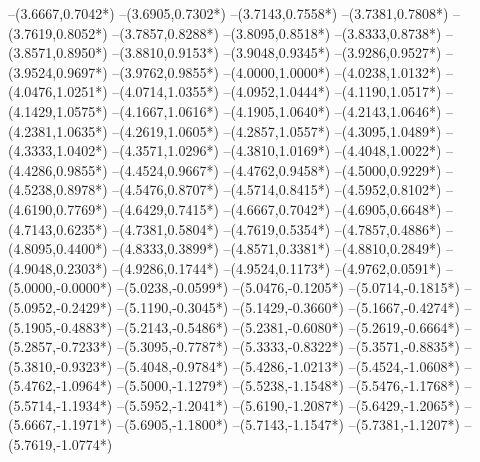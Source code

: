 {	--(3.6667,{0.7042*\yskala})
	--(3.6905,{0.7302*\yskala})
	--(3.7143,{0.7558*\yskala})
	--(3.7381,{0.7808*\yskala})
	--(3.7619,{0.8052*\yskala})
	--(3.7857,{0.8288*\yskala})
	--(3.8095,{0.8518*\yskala})
	--(3.8333,{0.8738*\yskala})
	--(3.8571,{0.8950*\yskala})
	--(3.8810,{0.9153*\yskala})
	--(3.9048,{0.9345*\yskala})
	--(3.9286,{0.9527*\yskala})
	--(3.9524,{0.9697*\yskala})
	--(3.9762,{0.9855*\yskala})
	--(4.0000,{1.0000*\yskala})
	--(4.0238,{1.0132*\yskala})
	--(4.0476,{1.0251*\yskala})
	--(4.0714,{1.0355*\yskala})
	--(4.0952,{1.0444*\yskala})
	--(4.1190,{1.0517*\yskala})
	--(4.1429,{1.0575*\yskala})
	--(4.1667,{1.0616*\yskala})
	--(4.1905,{1.0640*\yskala})
	--(4.2143,{1.0646*\yskala})
	--(4.2381,{1.0635*\yskala})
	--(4.2619,{1.0605*\yskala})
	--(4.2857,{1.0557*\yskala})
	--(4.3095,{1.0489*\yskala})
	--(4.3333,{1.0402*\yskala})
	--(4.3571,{1.0296*\yskala})
	--(4.3810,{1.0169*\yskala})
	--(4.4048,{1.0022*\yskala})
	--(4.4286,{0.9855*\yskala})
	--(4.4524,{0.9667*\yskala})
	--(4.4762,{0.9458*\yskala})
	--(4.5000,{0.9229*\yskala})
	--(4.5238,{0.8978*\yskala})
	--(4.5476,{0.8707*\yskala})
	--(4.5714,{0.8415*\yskala})
	--(4.5952,{0.8102*\yskala})
	--(4.6190,{0.7769*\yskala})
	--(4.6429,{0.7415*\yskala})
	--(4.6667,{0.7042*\yskala})
	--(4.6905,{0.6648*\yskala})
	--(4.7143,{0.6235*\yskala})
	--(4.7381,{0.5804*\yskala})
	--(4.7619,{0.5354*\yskala})
	--(4.7857,{0.4886*\yskala})
	--(4.8095,{0.4400*\yskala})
	--(4.8333,{0.3899*\yskala})
	--(4.8571,{0.3381*\yskala})
	--(4.8810,{0.2849*\yskala})
	--(4.9048,{0.2303*\yskala})
	--(4.9286,{0.1744*\yskala})
	--(4.9524,{0.1173*\yskala})
	--(4.9762,{0.0591*\yskala})
	--(5.0000,{-0.0000*\yskala})
	--(5.0238,{-0.0599*\yskala})
	--(5.0476,{-0.1205*\yskala})
	--(5.0714,{-0.1815*\yskala})
	--(5.0952,{-0.2429*\yskala})
	--(5.1190,{-0.3045*\yskala})
	--(5.1429,{-0.3660*\yskala})
	--(5.1667,{-0.4274*\yskala})
	--(5.1905,{-0.4883*\yskala})
	--(5.2143,{-0.5486*\yskala})
	--(5.2381,{-0.6080*\yskala})
	--(5.2619,{-0.6664*\yskala})
	--(5.2857,{-0.7233*\yskala})
	--(5.3095,{-0.7787*\yskala})
	--(5.3333,{-0.8322*\yskala})
	--(5.3571,{-0.8835*\yskala})
	--(5.3810,{-0.9323*\yskala})
	--(5.4048,{-0.9784*\yskala})
	--(5.4286,{-1.0213*\yskala})
	--(5.4524,{-1.0608*\yskala})
	--(5.4762,{-1.0964*\yskala})
	--(5.5000,{-1.1279*\yskala})
	--(5.5238,{-1.1548*\yskala})
	--(5.5476,{-1.1768*\yskala})
	--(5.5714,{-1.1934*\yskala})
	--(5.5952,{-1.2041*\yskala})
	--(5.6190,{-1.2087*\yskala})
	--(5.6429,{-1.2065*\yskala})
	--(5.6667,{-1.1971*\yskala})
	--(5.6905,{-1.1800*\yskala})
	--(5.7143,{-1.1547*\yskala})
	--(5.7381,{-1.1207*\yskala})
	--(5.7619,{-1.0774*\yskala})
}

